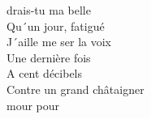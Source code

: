 drais-tu ma belle \\
Qu´un jour, fatigué \\
J´aille me ser la voix \\
Une dernière fois \\
A cent  décibels \\
Contre un grand châtaigner \\
mour pour  \\
\songwordfb{} 